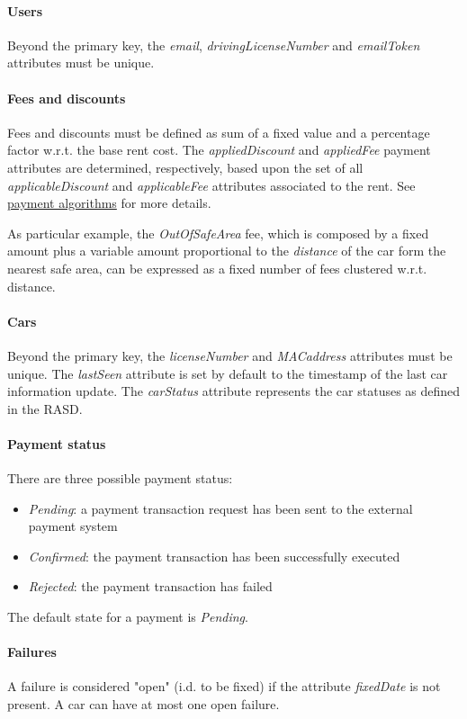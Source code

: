 \paragraph{Users} Beyond the primary key, the \mbox{\emph{email}}, \mbox{\emph{drivingLicenseNumber}} and \mbox{\emph{emailToken}} attributes must be unique.

\paragraph{Fees and discounts}
Fees and discounts must be defined as sum of a fixed value and a percentage factor w.r.t. the base rent cost.
The \emph{appliedDiscount} and \emph{appliedFee} payment attributes are determined, respectively, based upon the set of all \emph{applicableDiscount} and \emph{applicableFee} attributes associated to the rent. See \hyperref[sec:paymentAlgorithms]{payment algorithms} for more details.

As particular example, the \emph{OutOfSafeArea} fee, which is composed by a fixed amount plus a variable amount proportional to the \emph{distance} of the car form the nearest safe area, can be expressed as a fixed number of fees clustered w.r.t. distance.

\paragraph{Cars}Beyond the primary key, the \mbox{\emph{licenseNumber}} and \emph{MACaddress} attributes must be unique. The \mbox{\emph{lastSeen}} attribute is set by default to the timestamp of the last car information update. The \mbox{\emph{carStatus}} attribute represents the car statuses as defined in the RASD.

\paragraph{Payment status} There are three possible payment status:
\begin{itemize}
	\item \emph{Pending}: a payment transaction request has been sent to the external payment system
	\item \emph{Confirmed}: the payment transaction has been successfully executed
	\item \emph{Rejected}: the payment transaction has failed
\end{itemize}
The default state for a payment is \emph{Pending}.

\paragraph{Failures}A failure is considered "open" (i.d. to be fixed) if the attribute \emph{fixedDate} is not present. A car can have at most one open failure.

